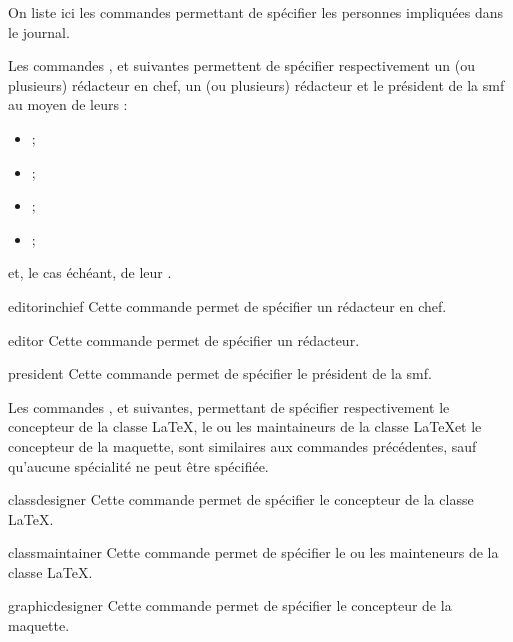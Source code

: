 On liste ici les commandes permettant de spécifier les personnes impliquées dans
le journal.

Les commandes ,  et 
suivantes permettent de spécifier respectivement un (ou plusieurs) rédacteur en
chef, un (ou plusieurs) rédacteur et le président de la \gls{smf} au moyen de
leurs :
\begin{itemize}
\item {} ;
\item {} ;
\item {} ;
\item {} ;
\end{itemize}
et, le cas échéant, de leur .

\begin{docCommand}{editorinchief}{}
  Cette commande permet de spécifier un rédacteur en chef.
\end{docCommand}

\begin{docCommand}{editor}{}
  Cette commande permet de spécifier un rédacteur.
\end{docCommand}

\begin{docCommand}{president}{}
  Cette commande permet de spécifier le président de la \gls{smf}.
\end{docCommand}

Les commandes ,  et
 suivantes, permettant de spécifier respectivement le
concepteur de la classe \LaTeX, le ou les maintaineurs de la classe \LaTeX et le
concepteur de la maquette, sont similaires aux commandes précédentes, sauf
qu'aucune spécialité ne peut être spécifiée.

\begin{docCommand}{classdesigner}{}
  Cette commande permet de spécifier le concepteur de la classe \LaTeX.
\end{docCommand}

\begin{docCommand}{classmaintainer}{}
  Cette commande permet de spécifier le ou les mainteneurs de la classe \LaTeX.
\end{docCommand}

\begin{docCommand}{graphicdesigner}{}
  Cette commande permet de spécifier le concepteur de la maquette.
\end{docCommand}

